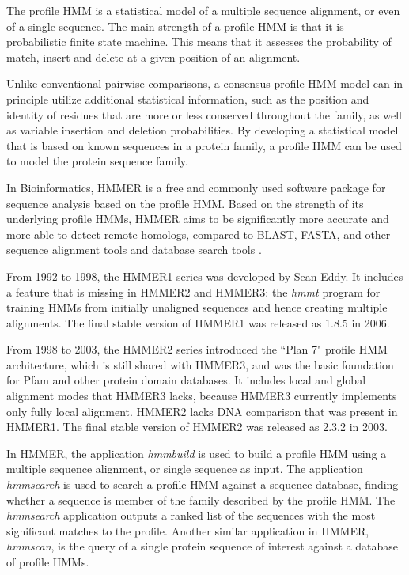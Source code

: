 The profile HMM is a statistical model of a multiple sequence alignment, or even of a single sequence. The main strength of a profile HMM is that it is probabilistic finite state machine. This means that it assesses the probability of match, insert and delete at a given position of an alignment.

Unlike conventional pairwise comparisons, a consensus profile HMM model can in principle utilize additional statistical information, such as the position and identity of residues that are more or less conserved throughout the family, as well as variable insertion and deletion probabilities. By developing a statistical model that is based on known sequences in a protein family, a profile HMM can be used to model the protein sequence family.

In Bioinformatics, HMMER \citep{HMMER} is a free and commonly used software package for sequence analysis based on the profile HMM. 
Based on the strength of its underlying profile HMMs, HMMER aims to be significantly more accurate and more able to detect remote homologs, compared to BLAST, FASTA, and other sequence alignment tools and database search tools \citep{HMMER3}.

From 1992 to 1998, the HMMER1 series was developed by Sean Eddy. It includes a feature that is missing in HMMER2 and HMMER3: the \emph{hmmt} program for training HMMs from initially unaligned sequences and hence creating multiple alignments. The final stable version of HMMER1 was released as 1.8.5 in 2006. 

From 1998 to 2003, the HMMER2 series introduced the ``Plan 7" profile HMM architecture, which is still shared with HMMER3, and was the basic foundation for Pfam and other protein domain databases. It includes local and global alignment modes that HMMER3 lacks, because HMMER3 currently implements only fully local alignment. HMMER2 lacks DNA comparison that was present in HMMER1. The final stable version of HMMER2 was released as 2.3.2 in 2003.

In HMMER, the application \emph{hmmbuild} is used to build a profile HMM using a multiple sequence alignment, or single sequence as input. The application \emph{hmmsearch} is used to search a profile HMM against a sequence database, finding whether a sequence is member of the family described by the profile HMM. The \emph{hmmsearch} application outputs a ranked list of the sequences with the most significant matches to the profile. Another similar application in HMMER, \emph{hmmscan}, is the query of a single protein sequence of interest against a database of profile HMMs.

